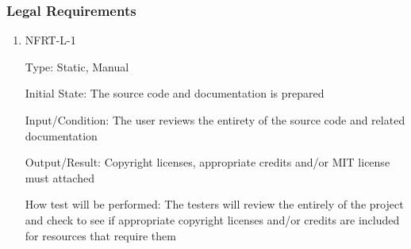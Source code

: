 \documentclass[12pt, titlepage]{article}
\begin{document}
\subsubsection{Legal Requirements}

\begin{enumerate}

\item{NFRT-L-1\\}

Type: Static, Manual
					
Initial State: The source code and documentation is prepared
					
Input/Condition: The user reviews the entirety of the source code and related documentation
					
Output/Result: Copyright licenses, appropriate credits and/or MIT license must attached
					
How test will be performed: The testers will review the entirely of the project and check to see if appropriate copyright licenses and/or credits are included for resources that require them

\end{enumerate}
\end{document}
